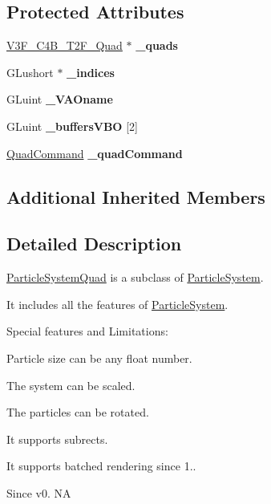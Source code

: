 \subsection*{Protected Attributes}
\begin{DoxyCompactItemize}
\item 
\mbox{\label{classParticleSystemQuad_af4ba6b5fece884ab69a76caa2fec5334}} 
\hyperlink{structV3F__C4B__T2F__Quad}{V3\+F\+\_\+\+C4\+B\+\_\+\+T2\+F\+\_\+\+Quad} $\ast$ {\bfseries \+\_\+quads}
\item 
\mbox{\label{classParticleSystemQuad_a57ac7811a8602f6ccb9da2440d04c52f}} 
G\+Lushort $\ast$ {\bfseries \+\_\+indices}
\item 
\mbox{\label{classParticleSystemQuad_a9564ffc9ea3aa4733bc6293c645f9fbc}} 
G\+Luint {\bfseries \+\_\+\+V\+A\+Oname}
\item 
\mbox{\label{classParticleSystemQuad_a3b84df4193c0298143d9ad5350ff0816}} 
G\+Luint {\bfseries \+\_\+buffers\+V\+BO} \mbox{[}2\mbox{]}
\item 
\mbox{\label{classParticleSystemQuad_a485395f093d383047be3eebd095a364d}} 
\hyperlink{classQuadCommand}{Quad\+Command} {\bfseries \+\_\+quad\+Command}
\end{DoxyCompactItemize}
\subsection*{Additional Inherited Members}


\subsection{Detailed Description}
\hyperlink{classParticleSystemQuad}{Particle\+System\+Quad} is a subclass of \hyperlink{classParticleSystem}{Particle\+System}. 

It includes all the features of \hyperlink{classParticleSystem}{Particle\+System}.

Special features and Limitations\+:
\begin{DoxyItemize}
\item Particle size can be any float number.
\item The system can be scaled.
\item The particles can be rotated.
\item It supports subrects.
\item It supports batched rendering since 1.. \begin{DoxySince}{Since}
v0.  NA 
\end{DoxySince}

\end{DoxyItemize}

